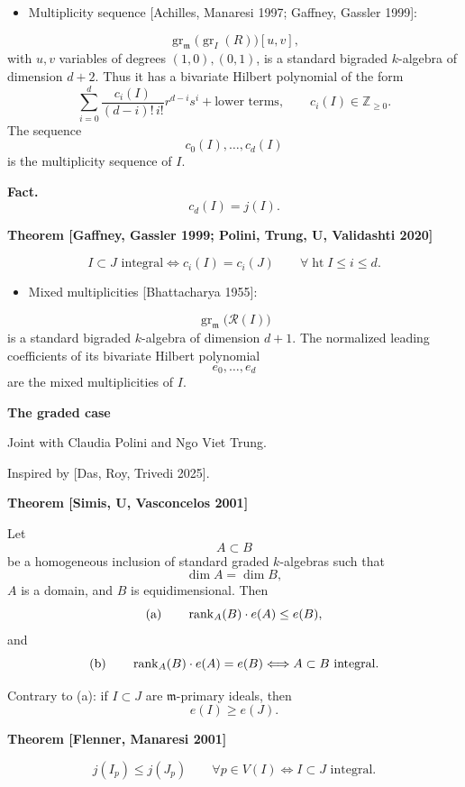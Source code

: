 \begin{itemize}
\item
Multiplicity sequence
[Achilles, Manaresi 1997;
Gaffney, Gassler 1999]:
\end{itemize}
$$
\operatorname{gr}_{\mathfrak{m}}
\bigl(\operatorname{gr}_I(R)\bigr)[u,v],
$$
with $u,v$ variables of degrees
$(1,0),(0,1)$, is a standard bigraded
$k$-algebra of dimension $d+2$.
Thus it has a bivariate Hilbert polynomial
of the form
$$
\sum_{i=0}^d
\frac{c_i(I)}{(d-i)!\,i!}
r^{d-i}s^i
+
\text{lower terms},
\qquad
c_i(I)\in\mathbb{Z}_{\geq 0}.
$$
The sequence
$$
c_0(I),\ldots,c_d(I)
$$
is the multiplicity sequence of $I$.

\medskip\noindent
{\bf Fact.}
$$
c_d(I)=j(I).
$$

\medskip\noindent
{\bf Theorem [Gaffney, Gassler 1999;
Polini, Trung, U, Validashti 2020]}

$$
I\subset J\text{ integral}
\Longleftrightarrow
c_i(I)=c_i(J)
\qquad
\forall\operatorname{ht}I\leq i\leq d.
$$

\begin{itemize}
\item
Mixed multiplicities
[Bhattacharya 1955]:
\end{itemize}
$$
\operatorname{gr}_{\mathfrak{m}}
\bigl(\mathcal{R}(I)\bigr)
$$
is a standard bigraded $k$-algebra of
dimension $d+1$.
The normalized leading coefficients of
its bivariate Hilbert polynomial
$$
e_0,\ldots,e_d
$$
are the mixed multiplicities of $I$.

\medskip\noindent
{\bf The graded case}

Joint with Claudia Polini and Ngo Viet
Trung.

Inspired by [Das, Roy, Trivedi 2025].

\medskip\noindent
{\bf Theorem [Simis, U, Vasconcelos 2001]}

Let
$$
A\subset B
$$
be a homogeneous inclusion of standard
graded $k$-algebras such that
$$
\dim A=\dim B,
$$
$A$ is a domain, and $B$ is
equidimensional. Then
$$
\textnormal{(a)}
\qquad
\operatorname{rank}_A(B)\cdot e(A)
\leq e(B),
$$
and
$$
\textnormal{(b)}
\qquad
\operatorname{rank}_A(B)\cdot e(A)
=
e(B)
\Longleftrightarrow
A\subset B\text{ integral}.
$$

Contrary to (a): if $I\subset J$ are
$\mathfrak{m}$-primary ideals, then
$$
e(I)\geq e(J).
$$

\medskip\noindent
{\bf Theorem [Flenner, Manaresi 2001]}

$$
j(I_p)\leq j(J_p)
\qquad
\forall p\in V(I)
\Longleftrightarrow
I\subset J\text{ integral}.
$$

